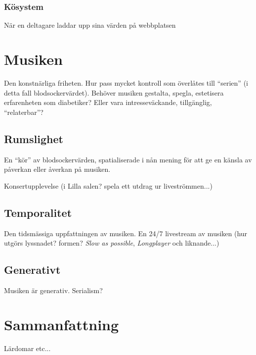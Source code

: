 \documentclass[11pt, twoside, a4paper]{article}
\begin{document}
\begin{multicols}{2}
\subsubsection*{Kösystem}
När en deltagare laddar upp sina värden på webbplatsen   

\section*{Musiken}
Den konstnärliga friheten. Hur pass mycket kontroll som överlåtes till \enquote{serien} (i detta fall blodsockervärdet). Behöver musiken gestalta, spegla, estetisera erfarenheten som diabetiker? Eller vara intresseväckande, tillgänglig, \enquote{relaterbar}? 

\subsection*{Rumslighet}
En \enquote{kör} av blodsockervärden, spatialiserade i nån mening för att ge en känsla av påverkan eller åverkan på musiken. 

Konsertupplevelse (i Lilla salen? spela ett utdrag ur liveströmmen...)

\subsection*{Temporalitet}
Den tidsmässiga uppfattningen av musiken. En 24/7 livestream av musiken (hur utgörs lyssnadet? formen? \emph{Slow as possible}, \emph{Longplayer} och liknande...)

\subsection*{Generativt}
Musiken är generativ. Serialism?

\section*{Sammanfattning}
Lärdomar etc...

\end{multicols}

\twocolumn

\printbibliography[type=book,title={Böcker}]
\printbibliography[type=article,title={Artiklar}]
\end{document}
